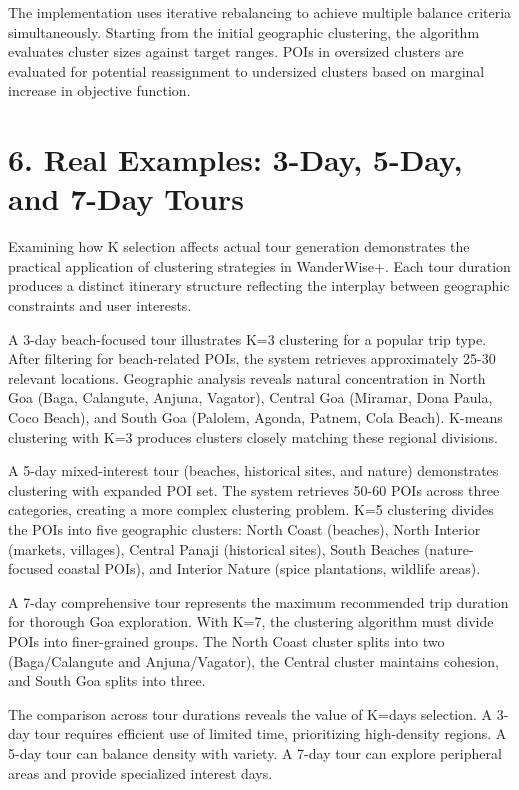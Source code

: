 The implementation uses iterative rebalancing to achieve multiple balance criteria simultaneously. Starting from the initial geographic clustering, the algorithm evaluates cluster sizes against target ranges. POIs in oversized clusters are evaluated for potential reassignment to undersized clusters based on marginal increase in objective function.

\section{6. Real Examples: 3-Day, 5-Day, and 7-Day Tours}

Examining how K selection affects actual tour generation demonstrates the practical application of clustering strategies in WanderWise+. Each tour duration produces a distinct itinerary structure reflecting the interplay between geographic constraints and user interests.

A 3-day beach-focused tour illustrates K=3 clustering for a popular trip type. After filtering for beach-related POIs, the system retrieves approximately 25-30 relevant locations. Geographic analysis reveals natural concentration in North Goa (Baga, Calangute, Anjuna, Vagator), Central Goa (Miramar, Dona Paula, Coco Beach), and South Goa (Palolem, Agonda, Patnem, Cola Beach). K-means clustering with K=3 produces clusters closely matching these regional divisions.

A 5-day mixed-interest tour (beaches, historical sites, and nature) demonstrates clustering with expanded POI set. The system retrieves 50-60 POIs across three categories, creating a more complex clustering problem. K=5 clustering divides the POIs into five geographic clusters: North Coast (beaches), North Interior (markets, villages), Central Panaji (historical sites), South Beaches (nature-focused coastal POIs), and Interior Nature (spice plantations, wildlife areas).

A 7-day comprehensive tour represents the maximum recommended trip duration for thorough Goa exploration. With K=7, the clustering algorithm must divide POIs into finer-grained groups. The North Coast cluster splits into two (Baga/Calangute and Anjuna/Vagator), the Central cluster maintains cohesion, and South Goa splits into three.

The comparison across tour durations reveals the value of K=days selection. A 3-day tour requires efficient use of limited time, prioritizing high-density regions. A 5-day tour can balance density with variety. A 7-day tour can explore peripheral areas and provide specialized interest days.

